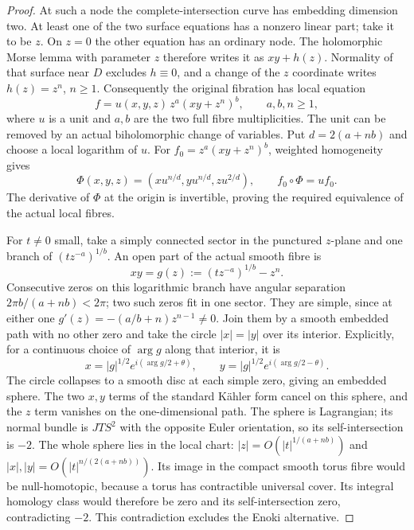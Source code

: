 \begin{proof}
At such a node the complete-intersection curve
has embedding dimension two. At least one of
the two surface equations has a nonzero linear
part; take it to be $z$. On $z=0$ the other
equation has an ordinary node. The holomorphic
Morse lemma with parameter $z$ therefore writes
it as $xy+h(z)$. Normality of that surface near
$D$ excludes $h\equiv0$, and a change of the
$z$ coordinate writes $h(z)=z^n$, $n\ge1$.
Consequently the original fibration has local
equation
\[
 f=u(x,y,z)\,z^a(xy+z^n)^b,
 \qquad a,b,n\ge1,
 \tag{C.INT.11}
\]
where $u$ is a unit and $a,b$ are the two full
fibre multiplicities. The unit can be removed
by an actual biholomorphic change of variables.
Put $d=2(a+nb)$ and choose a local logarithm of
$u$. For $f_0=z^a(xy+z^n)^b$, weighted homogeneity
gives
\[
 \Phi(x,y,z)=(x u^{n/d},y u^{n/d},z u^{2/d}),
 \qquad f_0\circ\Phi=u f_0.
 \tag{C.INT.12}
\]
The derivative of $\Phi$ at the origin is
invertible, proving the required equivalence
of the actual local fibres.

For $t\ne0$ small, take a simply connected
sector in the punctured $z$-plane and one
branch of $(t z^{-a})^{1/b}$. An open part
of the actual smooth fibre is
\[
 xy=g(z):=(t z^{-a})^{1/b}-z^n.
 \tag{C.INT.13}
\]
Consecutive zeros on this logarithmic branch
have angular separation $2\pi b/(a+nb)<2\pi$;
two such zeros fit in one sector. They are
simple, since at either one
$g'(z)=-(a/b+n)z^{n-1}\ne0$.
Join them by a smooth embedded path with no
other zero and take the circle $|x|=|y|$
over its interior. Explicitly, for a continuous
choice of $\arg g$ along that interior, it is
\[
 x=|g|^{1/2}e^{i(\arg g/2+\theta)},\qquad
 y=|g|^{1/2}e^{i(\arg g/2-\theta)}.
 \tag{C.INT.14}
\]
The circle collapses to a smooth disc at each
simple zero, giving an embedded sphere.
The two $x,y$ terms of the standard K\"ahler
form cancel on this sphere, and the $z$ term
vanishes on the one-dimensional path. The
sphere is Lagrangian; its normal bundle is
$JTS^2$ with the opposite Euler orientation,
so its self-intersection is $-2$.
The whole sphere lies in the local chart:
$|z|=O(|t|^{1/(a+nb)})$ and
$|x|,|y|=O(|t|^{n/(2(a+nb))})$.
Its image in the compact smooth torus fibre
would be null-homotopic, because a torus has
contractible universal cover. Its integral
homology class would therefore be zero and
its self-intersection zero, contradicting
$-2$. This contradiction excludes the Enoki
alternative.
\end{proof}

